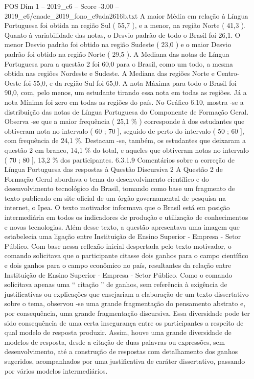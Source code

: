 \begin{textsample}{POS Dim 1 – 2019\_c6 – Score -3.00 – 2019\_c6/enade\_2019\_fono\_e9ada2616b.txt}
A maior Média em relação à Língua Portuguesa foi obtida na região Sul ( 55,7 ), e a menor, na região Norte ( 41,3 ).
Quanto à variabilidade das notas, o Desvio padrão de todo o Brasil foi 26,1.
O menor Desvio padrão foi obtido na região Sudeste ( 23,0 ) e o maior Desvio padrão foi obtido na região Norte ( 29,5 ).
A Mediana das notas de Língua Portuguesa para a questão 2 foi 60,0 para o Brasil, como um todo, a mesma obtida nas regiões Nordeste e Sudeste.
A Mediana das regiões Norte e Centro-Oeste foi 55,0, e da região Sul foi 65,0.
A nota Máxima para todo o Brasil foi 90,0, com, pelo menos, um estudante tirando essa nota em todas as regiões.
Já a nota Mínima foi zero em todas as regiões do país.
No Gráfico 6.10, mostra -se a distribuição das notas de Língua Portuguesa do Componente de Formação Geral.
Observa -se que a maior frequência ( 25,1 \% ) corresponde à dos estudantes que obtiveram nota no intervalo ( 60 ; 70 ], seguido de perto do intervalo ( 50 ; 60 ], com frequência de 24,1 \%.
Destacam -se, também, os estudantes que deixaram a questão 2 em branco, 14,1 \% do total, e aqueles que obtiveram notas no intervalo ( 70 ; 80 ], 13,2 \% dos participantes. 6.3.1.9 Comentários sobre a correção de Língua Portuguesa das respostas à Questão Discursiva 2 A Questão 2 de Formação Geral abordava o tema do desenvolvimento científico e do desenvolvimento tecnológico do Brasil, tomando como base um fragmento de texto publicado em site oficial de um órgão governamental de pesquisa na internet, o Ipea.
O texto motivador informava que o Brasil está em posição intermediária em todos os indicadores de produção e utilização de conhecimentos e novas tecnologias.
Além desse texto, a questão apresentava uma imagem que estabelecia uma ligação entre Instituição de Ensino Superior - Empresa - Setor Público.
Com base nessa reflexão inicial despertada pelo texto motivador, o comando solicitava que o participante citasse dois ganhos para o campo científico e dois ganhos para o campo econômico no país, resultantes da relação entre Instituição de Ensino Superior - Empresa - Setor Público.
Como o comando solicitava apenas uma “ citação ” de ganhos, sem referência à exigência de justificativas ou explicações que ensejariam a elaboração de um texto dissertativo sobre o tema, observou -se uma grande fragmentação do pensamento abstrato e, por consequência, uma grande fragmentação discursiva.
Essa diversidade pode ter sido consequência de uma certa insegurança entre os participantes a respeito de qual modelo de resposta produzir.
Assim, houve uma grande diversidade de modelos de resposta, desde a citação de duas palavras ou expressões, sem desenvolvimento, até a construção de respostas com detalhamento dos ganhos sugeridos, acompanhados por uma justificativa de caráter dissertativo, passando por vários modelos intermediários.

\end{textsample}
